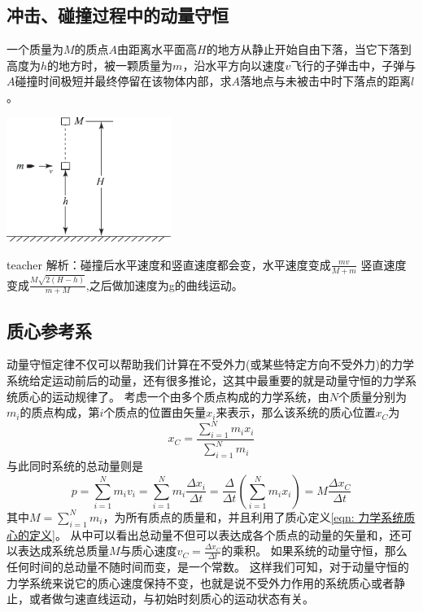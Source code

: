 \subsection{冲击、碰撞过程中的动量守恒}


\begin{example}

一个质量为$M$的质点$A$由距离水平面高$H$的地方从静止开始自由下落，当它下落到高度为$h$的地方时，被一颗质量为$m$，沿水平方向以速度$v$飞行的子弹击中，子弹与$A$碰撞时间极短并最终停留在该物体内部，求$A$落地点与未被击中时下落点的距离$l$。 
	\begin{flushright}
		\includegraphics[width = 0.4\textwidth]{images/momentum-5.pdf} 
	\end{flushright}
\begin{taggedblock}{teacher}
\noindent
解析：碰撞后水平速度和竖直速度都会变，水平速度变成$\frac{mv}{M+m}$ 竖直速度变成$\frac{M\sqrt{2(H-h)}}{m+M}$,之后做加速度为g的曲线运动。
\end{taggedblock}
\end{example}






\subsection{质心参考系}
动量守恒定律不仅可以帮助我们计算在不受外力(或某些特定方向不受外力)的力学系统给定运动前后的动量，还有很多推论，这其中最重要的就是动量守恒的力学系统质心的运动规律了。
考虑一个由多个质点构成的力学系统，由$N$个质量分别为$m_i$的质点构成，第$i$个质点的位置由矢量$x_i$来表示，那么该系统的质心位置$x_C$为
\begin{equation}\label{eqn: 力学系统质心的定义}
x_C = \frac{\sum_{i=1}^N m_ix_i}{\sum_{i=1}^N m_i}
\end{equation}
与此同时系统的总动量则是
\begin{equation}
p = \sum_{i=1}^N m_i v_i = \sum_{i=1}^Nm_i\frac{\Delta x_i}{\Delta t}=\frac{\Delta}{\Delta t}\left(\sum_{i=1}^N m_i x_i \right) = M \frac{\Delta x_C}{\Delta t}
\end{equation}
其中$M=\sum_{i=1}^N m_i$，为所有质点的质量和，并且利用了质心定义\ref{eqn: 力学系统质心的定义}。
从中可以看出总动量不但可以表达成各个质点的动量的矢量和，还可以表达成系统总质量$M$与质心速度$v_C = \frac{\Delta x_C}{\Delta t}$的乘积。
如果系统的动量守恒，那么任何时间的总动量不随时间而变，是一个常数。
这样我们可知，对于动量守恒的力学系统来说它的质心速度保持不变，也就是说不受外力作用的系统质心或者静止，或者做匀速直线运动，与初始时刻质心的运动状态有关。

